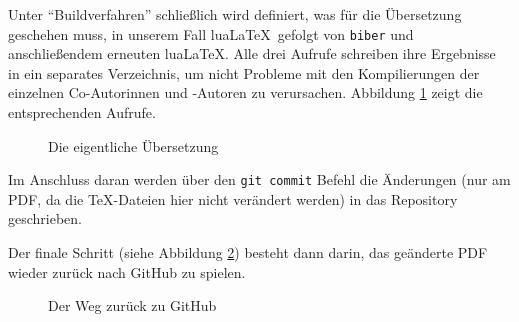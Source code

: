 Unter \enquote{Buildverfahren} schließlich wird definiert, was für die Übersetzung geschehen muss, in unserem Fall lua\LaTeX\ gefolgt von \texttt{biber} und anschließendem erneuten lua\LaTeX. Alle drei Aufrufe schreiben ihre Ergebnisse in ein separates Verzeichnis, um nicht Probleme mit den Kompilierungen der einzelnen Co-Autorinnen und -Autoren zu verursachen. Abbildung \ref{fig:jcompile} zeigt die entsprechenden Aufrufe.


\begin{figure}
\caption{Die eigentliche Übersetzung}\label{fig:jcompile}
\end{figure}


Im Anschluss daran werden über den \texttt{git commit} Befehl die Änderungen (nur am PDF, da die \TeX-Dateien hier nicht verändert werden) in das Repository geschrieben.

Der finale Schritt (siehe Abbildung \ref{fig:backGitHub}) besteht dann darin, das geänderte PDF wieder zurück nach GitHub zu spielen.

\begin{figure}
\caption{Der Weg zurück zu GitHub}\label{fig:backGitHub}
\end{figure}